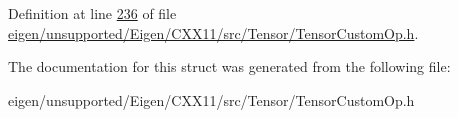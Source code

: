 Definition at line \hyperlink{eigen_2unsupported_2_eigen_2_c_x_x11_2src_2_tensor_2_tensor_custom_op_8h_source_l00236}{236} of file \hyperlink{eigen_2unsupported_2_eigen_2_c_x_x11_2src_2_tensor_2_tensor_custom_op_8h_source}{eigen/unsupported/\+Eigen/\+C\+X\+X11/src/\+Tensor/\+Tensor\+Custom\+Op.\+h}.



The documentation for this struct was generated from the following file\+:\begin{DoxyCompactItemize}
\item 
eigen/unsupported/\+Eigen/\+C\+X\+X11/src/\+Tensor/\+Tensor\+Custom\+Op.\+h\end{DoxyCompactItemize}
